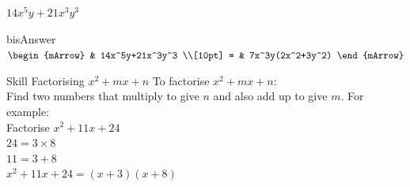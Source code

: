 \clearpage\noindent%
\begin{mtask}
    \task[] $14x^5y+21x^3y^3$
              \begin{envSolution}[equal height group=hRevF1]{bisAnswer}
			       $\begin{mArrow}
			             & 14x^5y+21x^3y^3   \\[10pt]
                       = & 7x^3y(2x^2+3y^2)              
	                \end{mArrow}$
              \end{envSolution}   
\end{mtask}
\clearpage\noindent%
\begin{boxSkill}{Skill   \thenskill \quad Factorising $x^2+mx+n$}
  To factorise $x^2+mx+n$:\\
  \-\hspace{1cm}Find two numbers that multiply to give $n$ and also add up to give $m$.
\tcbline 
  For example:\\
  \-\hspace{1cm}Factorise $x^2+11x+24$\\[15pt]
  \-\hspace{3cm} $24 = 3 \times 8$\\
  \-\hspace{3cm} $11 = 3 + 8$ \\[15pt]
  \-\hspace{2cm} $x^2+11x+24 = (x+3)(x+8)$
\end{boxSkill}
